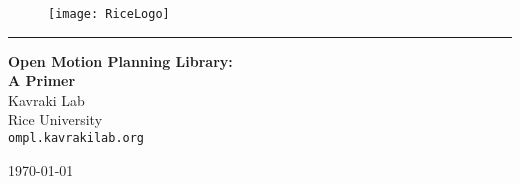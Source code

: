 \begin{titlepage}

\begin{center}



\begin {figure}
\centering
\texttt{[image: RiceLogo]}
\end{figure}
\vspace {0.25in}
\rule{\linewidth}{0.1mm}
\vspace {0.25in}

{ \huge \bfseries Open Motion Planning Library:\\ A Primer}
\\ [0.50in]
{\Large Kavraki Lab\\
Rice University
}
\\ [0.1in]
{\tt ompl.kavrakilab.org}


\vfill

{\large \today}

\end{center}

\end{titlepage}
